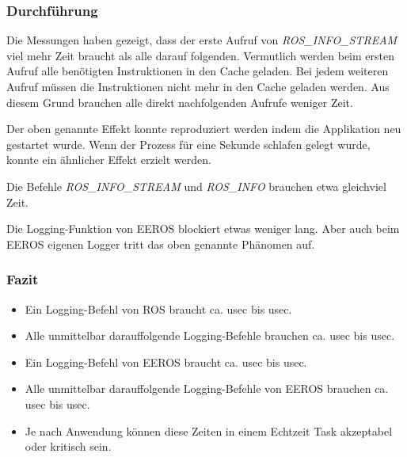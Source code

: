 \subsubsection{Durchführung}
Die Messungen haben gezeigt, dass der erste Aufruf von \textit{ROS\_INFO\_STREAM} viel mehr Zeit braucht als alle darauf folgenden.
Vermutlich werden beim ersten Aufruf alle benötigten Instruktionen in den Cache geladen.
Bei jedem weiteren Aufruf müssen die Instruktionen nicht mehr in den Cache geladen werden.
Aus diesem Grund brauchen alle direkt nachfolgenden Aufrufe weniger Zeit.

Der oben genannte Effekt konnte reproduziert werden indem die Applikation neu gestartet wurde.
Wenn der Prozess für eine Sekunde schlafen gelegt wurde, konnte ein ähnlicher Effekt erzielt werden.

Die Befehle \textit{ROS\_INFO\_STREAM} und \textit{ROS\_INFO} brauchen etwa gleichviel Zeit.

Die Logging-Funktion von EEROS blockiert etwas weniger lang.
Aber auch beim EEROS eigenen Logger tritt das oben genannte Phänomen auf.

\subsubsection{Fazit}
\begin{itemize}
\item Ein Logging-Befehl von ROS braucht ca. \unit[50]{usec} bis \unit[80]{usec}.
\item Alle unmittelbar darauffolgende Logging-Befehle brauchen ca. \unit[10]{usec} bis \unit[15]{usec}.
\item Ein Logging-Befehl von EEROS braucht ca. \unit[30]{usec} bis \unit[70]{usec}.
\item Alle unmittelbar darauffolgende Logging-Befehle von EEROS brauchen ca. \unit[3]{usec} bis \unit[15]{usec}.
\item Je nach Anwendung können diese Zeiten in einem Echtzeit Task akzeptabel oder kritisch sein.
\end{itemize}




